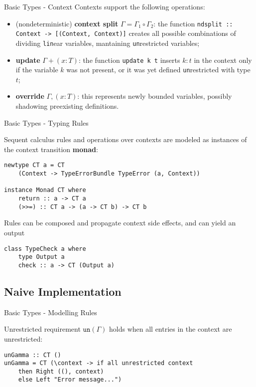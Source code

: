 \begin{frame}[fragile]{Basic Types - Context}
    Contexts support the following operations:
    \begin{itemize}
        \item (nondeterministic) \textbf{context split} $\Gamma = \Gamma_1 \circ \Gamma_2$: the function \texttt{ndsplit :: Context -> [(Context, Context)]} creates all possible combinations of dividing \texttt{lin}ear variables, mantaining \texttt{un}restricted variables;
        \item \textbf{update} $\Gamma + (x : T)$: the function \texttt{update k t} inserts $k : t$ in the context only if the variable $k$ was not present, or it was yet defined \texttt{un}restricted with type $t$;
        \item \textbf{override} $\Gamma, (x : T)$: this represents newly bounded variables, possibly shadowing preexisting definitions.
    \end{itemize}
\end{frame}

\begin{frame}[fragile]{Basic Types - Typing Rules}

    Sequent calculus rules and operations over contexts are modeled as instances of the context transition \textbf{monad}:

    \begin{verbatim}
newtype CT a = CT 
    (Context -> TypeErrorBundle TypeError (a, Context))

instance Monad CT where
    return :: a -> CT a
    (>>=) :: CT a -> (a -> CT b) -> CT b
\end{verbatim}
    Rules can be composed and propagate context side effects, and can yield an output

    \begin{verbatim}
class TypeCheck a where
    type Output a
    check :: a -> CT (Output a)
    \end{verbatim}
\end{frame}

\subsection{Naive Implementation}

\begin{frame}[fragile]{Basic Types - Modelling Rules}

    \begin{exampleblock}{Unrestricted requirement}
        $\texttt{un}(\Gamma)$ holds when all entries in the context are unrestricted:
\vspace{0.5cm}
        \begin{verbatim}
unGamma :: CT ()
unGamma = CT (\context -> if all unrestricted context
    then Right ((), context)
    else Left "Error message...")  
        \end{verbatim}
    \end{exampleblock}
\end{frame}

